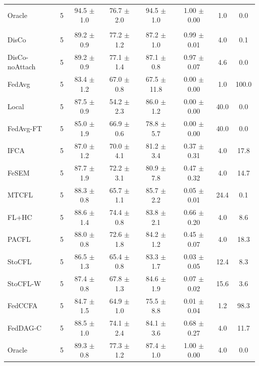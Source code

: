{\begin{tabular}{l r c c c c c c}
Oracle & 5 & 94.5 $\pm$ 1.0 & 76.7 $\pm$ 2.0 & 94.5 $\pm$ 1.0 & 1.00 $\pm$ 0.00 & 1.0 & 0.0 \\
\addlinespace
\multicolumn{8}{l}{\textit{Minority groups}} \\
DisCo & 5 & 89.2 $\pm$ 0.9 & 77.2 $\pm$ 1.2 & 87.2 $\pm$ 1.0 & 0.99 $\pm$ 0.01 & 4.0 & 0.1 \\
DisCo-noAttach & 5 & 89.2 $\pm$ 0.9 & 77.1 $\pm$ 1.4 & 87.1 $\pm$ 0.8 & 0.97 $\pm$ 0.07 & 4.6 & 0.0 \\
FedAvg & 5 & 83.4 $\pm$ 1.2 & 67.0 $\pm$ 0.8 & 67.5 $\pm$ 11.8 & 0.00 $\pm$ 0.00 & 1.0 & 100.0 \\
Local & 5 & 87.5 $\pm$ 0.9 & 54.2 $\pm$ 2.3 & 86.0 $\pm$ 1.2 & 0.00 $\pm$ 0.00 & 40.0 & 0.0 \\
FedAvg-FT & 5 & 85.0 $\pm$ 1.9 & 66.9 $\pm$ 0.6 & 78.8 $\pm$ 5.7 & 0.00 $\pm$ 0.00 & 40.0 & 0.0 \\
IFCA & 5 & 87.0 $\pm$ 1.2 & 70.0 $\pm$ 4.1 & 81.2 $\pm$ 3.4 & 0.37 $\pm$ 0.31 & 4.0 & 17.8 \\
FeSEM & 5 & 87.7 $\pm$ 1.9 & 72.2 $\pm$ 3.1 & 80.9 $\pm$ 7.8 & 0.47 $\pm$ 0.32 & 4.0 & 14.7 \\
MTCFL & 5 & 88.3 $\pm$ 0.8 & 65.7 $\pm$ 1.1 & 85.7 $\pm$ 2.2 & 0.05 $\pm$ 0.01 & 24.4 & 0.1 \\
FL+HC & 5 & 88.6 $\pm$ 1.4 & 74.4 $\pm$ 0.8 & 83.8 $\pm$ 2.1 & 0.66 $\pm$ 0.20 & 4.0 & 8.6 \\
PACFL & 5 & 88.0 $\pm$ 0.8 & 72.6 $\pm$ 1.8 & 84.2 $\pm$ 1.2 & 0.45 $\pm$ 0.07 & 4.0 & 18.3 \\
StoCFL & 5 & 86.5 $\pm$ 1.3 & 65.4 $\pm$ 0.8 & 83.3 $\pm$ 1.7 & 0.03 $\pm$ 0.05 & 12.4 & 8.3 \\
StoCFL-W & 5 & 87.4 $\pm$ 0.8 & 67.8 $\pm$ 1.3 & 84.6 $\pm$ 1.9 & 0.07 $\pm$ 0.02 & 15.6 & 3.6 \\
FedCCFA & 5 & 84.7 $\pm$ 1.5 & 64.9 $\pm$ 1.0 & 75.5 $\pm$ 8.8 & 0.01 $\pm$ 0.04 & 1.2 & 98.3 \\
FedDAG-C & 5 & 88.5 $\pm$ 1.0 & 74.1 $\pm$ 2.4 & 84.1 $\pm$ 3.6 & 0.68 $\pm$ 0.27 & 4.0 & 11.7 \\
Oracle & 5 & 89.3 $\pm$ 0.8 & 77.3 $\pm$ 1.2 & 87.4 $\pm$ 1.0 & 1.00 $\pm$ 0.00 & 4.0 & 0.0 \\
\bottomrule
\end{tabular}
}
